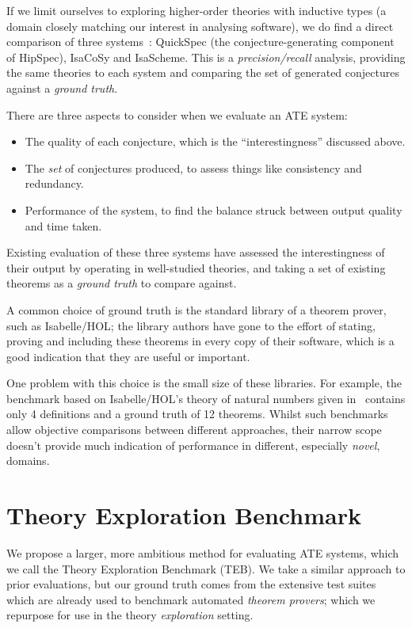 If we limit ourselves to exploring higher-order theories with inductive types
(a domain closely matching our interest in analysing software), we do find a
direct comparison of three systems~\cite{claessen2013automating}: QuickSpec (the
conjecture-generating component of HipSpec), IsaCoSy and IsaScheme. This is a
\emph{precision/recall} analysis, providing the same theories to each system and
comparing the set of generated conjectures against a \emph{ground truth}.

There are three aspects to consider when we evaluate an ATE system:

\begin{itemize}
\item The quality of each conjecture, which is the ``interestingness'' discussed
  above.
\item The \emph{set} of conjectures produced, to assess things like consistency
  and redundancy.
\item Performance of the system, to find the balance struck between output
  quality and time taken.
\end{itemize}

Existing evaluation of these three systems have assessed the interestingness of
their output by operating in well-studied theories, and taking a set of existing
theorems as a \emph{ground truth} to compare against.

A common choice of ground truth is the standard library of a theorem prover,
such as Isabelle/HOL; the library authors have gone to the effort of stating,
proving and including these theorems in every copy of their software, which is a
good indication that they are useful or important.

One problem with this choice is the small size of these libraries. For example,
the benchmark based on Isabelle/HOL's theory of natural numbers given
in~\cite{Johansson.Dixon.Bundy:conjecture-generation} contains only 4
definitions and a ground truth of 12 theorems. Whilst such benchmarks allow
objective comparisons between different approaches, their narrow scope doesn't
provide much indication of performance in different, especially \emph{novel}, domains.

\section{Theory Exploration Benchmark}
\label{sec:proposal}

We propose a larger, more ambitious method for evaluating ATE systems, which we
call the Theory Exploration Benchmark (TEB). We take a similar approach to prior
evaluations, but our ground truth comes from the extensive test suites which are
already used to benchmark automated \emph{theorem provers}; which we repurpose
for use in the theory \emph{exploration} setting.

